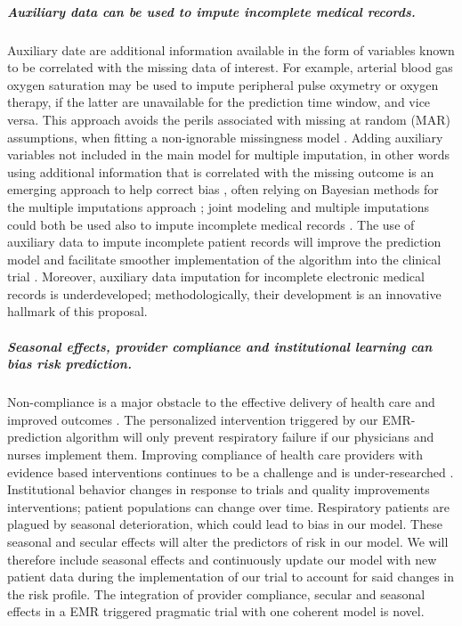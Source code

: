 \documentclass[11pt,notitlepage]{article}
\begin{document}
\subparagraph*{Auxiliary data can be used to impute incomplete medical records.}
Auxiliary date are additional information available in the form of variables known to be correlated with the missing data of interest. For example, arterial blood gas oxygen saturation may be used to impute peripheral pulse oxymetry or oxygen therapy, if the latter are unavailable for the prediction time window, and vice versa. This approach avoids the perils associated with missing at random (MAR) assumptions, when fitting a non-ignorable missingness model \cite{Wang_20029935}. Adding auxiliary variables not included in the main model for multiple imputation, in other words using additional information that is correlated with the missing outcome is an emerging approach to help correct bias \cite{Meng_1994, Collins_11778676, Rubin_1996}, often relying on Bayesian methods for the multiple imputations approach \cite{Daniels_2008, Schafer_1997}; joint modeling and multiple imputations could both be used also to impute incomplete medical records \cite{Fitzmaurice_2008}. The use of auxiliary data to impute incomplete patient records will improve the prediction model and facilitate smoother implementation of the algorithm into the clinical trial \cite{Hall_25389642}. Moreover, auxiliary data imputation for incomplete electronic medical records is underdeveloped; methodologically, their development is an innovative hallmark of this proposal.

\subparagraph*{Seasonal effects, provider compliance and institutional learning can bias risk prediction.} 
Non-compliance is a major obstacle to the effective delivery of health care and improved outcomes \cite{Duncan_16710766}. The personalized intervention triggered by our EMR-prediction algorithm will only prevent respiratory failure if our physicians and nurses implement them. Improving compliance of health care providers with evidence based interventions continues to be a challenge and is under-researched \cite{Davis_7650822}. Institutional behavior changes in response to trials and quality improvements interventions; patient populations can change over time. Respiratory patients are plagued by seasonal deterioration, which could lead to bias in our model. These seasonal and secular effects will alter the predictors of risk in our model. We will therefore include seasonal effects and continuously update our model with new patient data during the implementation of our trial to account for said changes in the risk profile. The integration of provider compliance, secular and seasonal effects in a EMR triggered pragmatic trial with one coherent model is novel. 
\end{document}
